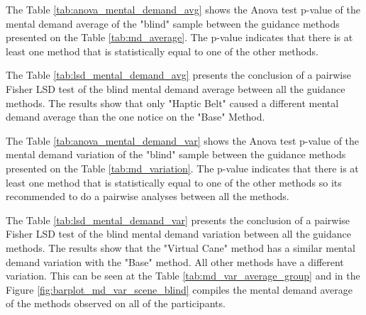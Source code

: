 %

\begin{table}[!htb]
    \begin{minipage}{.45\linewidth}
        
    \end{minipage}
    \hfill
    \begin{minipage}{.45\linewidth}
        \vspace{-2.75cm}
        
    \end{minipage}
\end{table}

The Table \ref{tab:anova_mental_demand_avg} shows the Anova test p-value of the mental demand average of the "blind" sample between the guidance methods presented on the Table \ref{tab:md_average}. The p-value indicates that there is at least one method that is statistically equal to one of the other methods.



The Table \ref{tab:lsd_mental_demand_avg} presents the conclusion of a pairwise Fisher LSD test of the blind mental demand average between all the guidance methods. The results show that only "Haptic Belt" caused a different mental demand average than the one notice on the "Base" Method.



The Table \ref{tab:anova_mental_demand_var} shows the Anova test p-value of the mental demand variation of the "blind" sample between the guidance methods presented on the Table \ref{tab:md_variation}. The p-value indicates that there is at least one method that is statistically equal to one of the other methods so its recommended to do a pairwise analyses between all the methods.





The Table \ref{tab:lsd_mental_demand_var} presents the conclusion of a pairwise Fisher LSD test of the blind mental demand variation between all the guidance methods. The results show that the "Virtual Cane" method has a similar mental demand variation with the "Base" method. All other methods have a different variation. This can be seen at the Table \ref{tab:md_var_average_group} and in the Figure \ref{fig:barplot_md_var_scene_blind} compiles the mental demand average of the methods observed on all of the participants.

